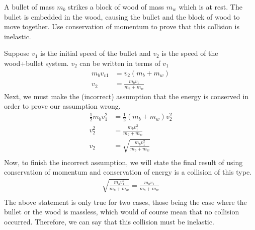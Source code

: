 \begin{solution}
\end{solution}


\question A bullet of mass $m_b$ strikes a block of wood of mass $m_w$ which is at rest. The bullet is embedded in the wood, causing the bullet and the block of wood to move together. Use conservation of momentum to prove that this collision is inelastic.
\begin{solution}
Suppose $v_1$ is the initial speed of the bullet and $v_2$ is the speed of the wood+bullet system. $v_2$ can be written in terms of $v_1$ 
\begin{align*}
m_bv_{v1}&= v_2(m_b+m_w)\\
v_2&=\frac{m_bv_1}{m_b+m_w}
\end{align*}
Next, we must make the (incorrect) assumption that the energy is conserved in order to prove our assumption wrong.
\begin{align*}
\frac{1}{2}m_bv_1^2&=\frac{1}{2}(m_b+m_w)v_2^2\\
v_2^2&=\frac{m_bv_1^2}{m_b+m_w}\\
v_2&=\sqrt{\frac{m_bv_1^2}{m_b+m_w}}\\
\end{align*}
Now, to finish the incorrect assumption, we will state the final result of using conservation of momentum and conservation of energy is a collision of this type.
\begin{align*}
\sqrt{\frac{m_bv_1^2}{m_b+m_w}}=\frac{m_bv_1}{m_b+m_w}\\
\end{align*}
The above statement is only true for two cases, those being the case where the bullet or the wood is massless, which would of course mean that no collision occurred. Therefore, we can say that this collision must be inelastic.
\end{solution}



